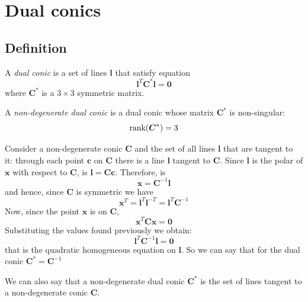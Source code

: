 \documentclass[12pt, a4paper]{report}
\newtheorem[style=M,bodystyle=\normalfont]{theorem}{Theorem}
\newtheorem[style=M,bodystyle=\normalfont]{corollary}{Corollary}
\newtheorem[style=M,bodystyle=\normalfont]{lemma}{Lemma}
\newtheorem[style=M,bodystyle=\normalfont]{definition}{Definition}
\begin{document}
    \section{Dual conics}
    \subsection{Definition}
    \begin{definition}
        A \emph{dual conic} is a set of lines $\boldsymbol{l}$ that satisfy equation
        \[\boldsymbol{l}^T\boldsymbol{C}^{*}\boldsymbol{l}=\boldsymbol{0}\]
        where $\boldsymbol{C}^{*}$ is a $3 \times 3$ symmetric matrix.

        A \emph{non-degenerate dual conic} is a dual conic whose matrix $\boldsymbol{C}^{*}$ is non-singular: 
        \[\textnormal{rank}(\boldsymbol{C}^{*})=3\]
    \end{definition}
    Consider a non-degenerate conic $\boldsymbol{C}$ and the set of all lines $\boldsymbol{l}$ that are tangent to it: through each point $\boldsymbol{c}$ on $\boldsymbol{C}$ there is a line 
    $\boldsymbol{l}$ tangent to $\boldsymbol{C}$. Since $\boldsymbol{l}$ is the polar of $\boldsymbol{x}$ with respect to $\boldsymbol{C}$, is $\boldsymbol{l}=\boldsymbol{Cc}$. Therefore, is
    \[\boldsymbol{x}=\boldsymbol{C}^{-1}\boldsymbol{l}\]
    and hence, since $\boldsymbol{C}$ is symmetric we have 
    \[\boldsymbol{x}^T=\boldsymbol{l}^T\boldsymbol{l}^{-T}=\boldsymbol{l}^T\boldsymbol{C}^{-1}\]
    Now, since the point $\boldsymbol{x}$ is on $\boldsymbol{C}$,
    \[\boldsymbol{x}^T\boldsymbol{C}\boldsymbol{x}=\boldsymbol{0}\]
    Substituting the values found previously we obtain: 
    \[\boldsymbol{l}^T\boldsymbol{C}^{-1}\boldsymbol{l}=\boldsymbol{0}\]
    that is the quadratic homogeneous equation on $\boldsymbol{l}$. So we can say that for the dual conic $\boldsymbol{C}^{*}=\boldsymbol{C}^{-1}$

    We can also say that a non-degenerate dual conic $\boldsymbol{C}^{*}$ is the set of lines tangent to a non-degenerate conic $\boldsymbol{C}$. 
\end{document}
